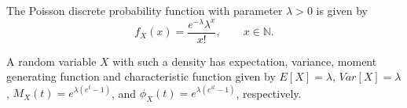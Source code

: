 \documentclass{article}
\begin{document}

The Poisson discrete probability function with parameter $\lambda>0$ is given by  $$f_X(x) = \frac{e^{-\lambda} \lambda^x}{x!},\quad\quad     x\in \mathbb{N}.$$

A random variable $X$ with such a density has expectation, variance, moment generating function and characteristic function given by $E[X] = \lambda$,  $Var[X] = \lambda$, $M_X(t) = e^{\lambda (e^t - 1)}$, and $\phi_X(t) = e^{\lambda(e^{it}-1)}$, respectively.
\end{document}

